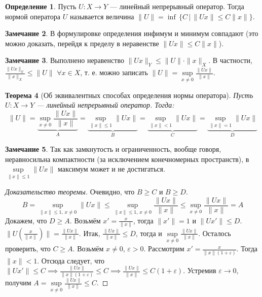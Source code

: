 \documentclass[11pt,openany,a4paper]{scrartcl}
\theoremstyle{plain}
\newtheorem{theorem}{Теорема}[section]
\theoremstyle{definition}
\newtheorem{definition}[theorem]{Определение}
\newtheorem{remark}[theorem]{Замечание}
\begin{document}
\begin{definition}
    Пусть $U: X \to Y$ — линейный непрерывный оператор. Тогда нормой оператора $U$
    называется величина $\|U\| = \inf\,\{C\,\big|\,\|Ux\| \leqslant C \|x\|\}$.
\end{definition}
\begin{remark}
    В формулировке определения инфимум и минимум совпадают (это можно доказать, перейдя к 
    пределу в неравенстве $\|Ux\| \leqslant C \|x\|$).
\end{remark}
\begin{remark}
    Выполнено неравенство $\|Ux\|_Y \leqslant \|U\|\cdot \|x\|_X$. В частности,
    $\frac{\|Ux\|_Y}{\|x\|_X} \leqslant \|U\|$ $\forall x \in X$, т. е. можно записать
    $\|U\| = \sup\limits_{x \neq 0}\frac{\|Ux\|}{\|x\|}$. 
\end{remark}
\begin{theorem}[Об эквивалентных способах определения нормы оператора]
     Пусть $U: X \to Y$ — линейный непрерывный оператор. Тогда:
     $$
     \|U\| = \underbrace{\sup\limits_{x \neq 0}\frac{\|Ux\|}{\|x\|}}_A =
     \underbrace{\sup\limits_{\|x\|\leqslant 1} \|Ux\|}_B =
     \underbrace{\sup\limits_{\|x\| < 1} \|Ux\|}_C =
     \underbrace{\sup\limits_{\|x\| = 1} \|Ux\|}_D
     $$
\end{theorem}
\begin{remark}
    Так как замкнутость и ограниченность, вообще говоря, неравносильна компактности
    (за исключением конечномерных пространств),
    в $\sup\limits_{\|x\|\leqslant 1} \|Ux\|$ максимум может и не достигаться.
\end{remark}
\begin{proof}[Доказательство теоремы]
    Очевидно, что $B \geqslant C$ и $B \geqslant D$.
    $$
    B =\sup\limits_{\|x\|\leqslant 1,\,x \neq 0} \|Ux\| \leqslant
    \sup\limits_{\|x\|\leqslant 1,\,x \neq 0} \frac{\|Ux\|}{\|x\|} \leqslant
    \sup\limits_{x \neq 0} \frac{\|Ux\|}{\|x\|} = A
    $$
    Докажем, что $D \geqslant A$. Возьмём $x'=\frac{x}{\|x\|}$, тогда $\|x'\|=1$ и
    $\|Ux'\|\leqslant D$. $\|U(\frac{x}{\|x\|})\| = \frac{\|Ux\|}{\|x\|}$.
    Итак, $\frac{\|Ux\|}{\|x\|} \leqslant D$, тогда и
    $\sup\limits_{x \neq 0}\frac{\|Ux\|}{\|x\|}$.
    Осталось проверить, что $C \geqslant A$. Возьмём $x \neq 0$, $\varepsilon > 0$.
    Рассмотрим $x' = \frac{x}{\|x\|(1 + \varepsilon)}$. Тогда $\|x\| < 1$. Отсюда
    следует, что $\|Ux'\| \leqslant C \implies \frac{\|Ux\|}{\|x\|(1+\varepsilon)}
    \leqslant C \implies \frac{\|Ux\|}{\|x\|}\leqslant C(1 + \varepsilon)$. Устремив
    $\varepsilon \to 0$, получим
    $A = \sup\limits_{x \neq 0} \frac{\|Ux\|}{\|x\|} \leqslant C$.
\end{proof}
\end{document}
